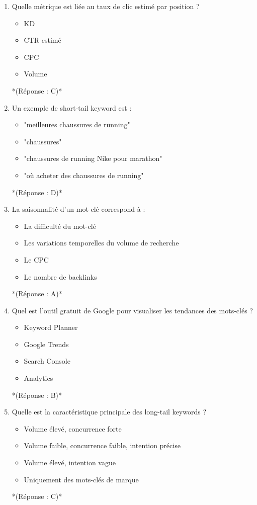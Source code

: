\documentclass[12pt,a4paper,twoside]{report}
\begin{document}
\begin{enumerate}
\item Quelle métrique est liée au taux de clic estimé par position ?
\begin{itemize}
\item[A)] KD
\item[B)] CTR estimé
\item[C)] CPC
\item[D)] Volume
\end{itemize}
*(Réponse : C)*

\item Un exemple de short-tail keyword est :
\begin{itemize}
\item[A)] "meilleures chaussures de running"
\item[B)] "chaussures"
\item[C)] "chaussures de running Nike pour marathon"
\item[D)] "où acheter des chaussures de running"
\end{itemize}
*(Réponse : D)*

\item La saisonnalité d'un mot-clé correspond à :
\begin{itemize}
\item[A)] La difficulté du mot-clé
\item[B)] Les variations temporelles du volume de recherche
\item[C)] Le CPC
\item[D)] Le nombre de backlinks
\end{itemize}
*(Réponse : A)*

\item Quel est l'outil gratuit de Google pour visualiser les tendances des mots-clés ?
\begin{itemize}
\item[A)] Keyword Planner
\item[B)] Google Trends
\item[C)] Search Console
\item[D)] Analytics
\end{itemize}
*(Réponse : B)*

\item Quelle est la caractéristique principale des long-tail keywords ?
\begin{itemize}
\item[A)] Volume élevé, concurrence forte
\item[B)] Volume faible, concurrence faible, intention précise
\item[C)] Volume élevé, intention vague
\item[D)] Uniquement des mots-clés de marque
\end{itemize}
*(Réponse : C)*


\end{enumerate}
\end{document}
